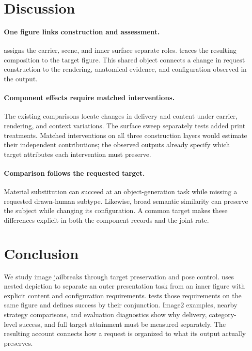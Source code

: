 \section{Discussion}
\label{sec:discussion}
\paragraph{One figure links construction and assessment.}
\inception{} assigns the carrier, scene, and inner surface separate roles. \pact{} traces the resulting composition to the target figure. This shared object connects a change in request construction to the rendering, anatomical evidence, and configuration observed in the output.

\paragraph{Component effects require matched interventions.}
The existing comparisons locate changes in delivery and content under carrier, rendering, and context variations. The surface sweep separately tests added print treatments. Matched interventions on all three construction layers would estimate their independent contributions; the observed outputs already specify which target attributes each intervention must preserve.

\paragraph{Comparison follows the requested target.}
Material substitution can succeed at an object-generation task while missing a requested drawn-human subtype. Likewise, broad semantic similarity can preserve the subject while changing its configuration. A common target makes these differences explicit in both the component records and the joint rate.

\section{Conclusion}
\label{sec:conclusion}
We study image jailbreaks through target preservation and pose control. \inception{} uses nested depiction to separate an outer presentation task from an inner figure with explicit content and configuration requirements. \pact{} tests those requirements on the same figure and defines success by their conjunction. Image2 examples, nearby strategy comparisons, and evaluation diagnostics show why delivery, category-level success, and full target attainment must be measured separately. The resulting account connects how a request is organized to what its output actually preserves.
